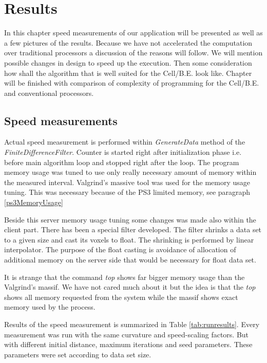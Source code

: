 \chapter{Results}

In this chapter speed measurements of our application will be presented as well as a few pictures of the results.
Because we have not accelerated the computation over traditional processors a discussion of the reasons will follow.
We will mention possible changes in design to speed up the execution.
Then some consideration how shall the algorithm that is well suited for the \mbox{Cell/B.E.} look like.
Chapter will be finished with comparison of complexity of programming for the \mbox{Cell/B.E.} and conventional processors.

\section{Speed measurements}

\par
Actual speed measurement is performed within \mbox{\emph{GenerateData}} method of the \mbox{\emph{FiniteDifferenceFilter}}.
Counter is started right after initialization phase i.e. before main algorithm loop and stopped right after the loop.
The program memory usage was tuned to use only really necessary amount of memory within the measured interval.
Valgrind's massive tool was used for the memory usage tuning.
This was necessary because of the PS3 limited memory, see paragraph \ref{ps3MemoryUsage}

\par
Beside this server memory usage tuning some changes was made also within the client part.
There has been a special filter developed.
The filter shrinks a data set to a given size and cast its voxels to float.
The shrinking is performed by linear interpolator.
The purpose of the float casting is avoidance of allocation of additional memory on the server side that would be necessary for float data set.

\par
It is strange that the command \emph{top} shows far bigger memory usage than the Valgrind's massif.
We have not cared much about it but the idea is that the \emph{top} shows all memory requested from the system while the massif shows exact memory used by the process.

\par
Results of the speed measurement is summarized in Table \ref{tab:runresults}.
Every measurement was run with the same curvature and speed-scaling factors.
But with different initial distance, maximum iterations and seed parameters.
These parameters were set according to data set size.

